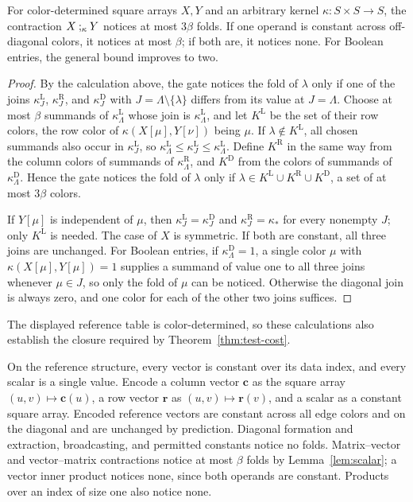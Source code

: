 \begin{lemma}\label{lem:scalar}
For color-determined square arrays $X,Y$ and an arbitrary kernel
$\kappa:S\times S\to S$, the contraction $X\mathbin{;_{\kappa}} Y$ notices
at most $3\beta$ folds. If one operand is constant across off-diagonal
colors, it notices at most $\beta$; if both are, it notices none.
For Boolean entries, the general bound improves to two.
\end{lemma}
\begin{proof}
By the calculation above, the gate notices the fold of $\lambda$
only if one of the joins $\kappa_J^{\mathrm L}$,
$\kappa_J^{\mathrm R}$, and $\kappa_J^{\mathrm D}$ with
$J=\Lambda\setminus\{\lambda\}$ differs from its value at
$J=\Lambda$. Choose at most $\beta$ summands of
$\kappa_\Lambda^{\mathrm L}$ whose join is
$\kappa_\Lambda^{\mathrm L}$, and let $K^{\mathrm L}$ be the
set of their row colors, the row color of
$\kappa(X[\mu],Y[\nu])$ being $\mu$. If
$\lambda\notin K^{\mathrm L}$, all chosen summands also occur in
$\kappa_J^{\mathrm L}$, so
$\kappa_\Lambda^{\mathrm L}\le
\kappa_J^{\mathrm L}\le\kappa_\Lambda^{\mathrm L}$.
Define $K^{\mathrm R}$ in the same way from the column colors of
summands of $\kappa_\Lambda^{\mathrm R}$, and $K^{\mathrm D}$
from the colors of summands of $\kappa_\Lambda^{\mathrm D}$.
Hence the gate notices the fold of $\lambda$ only if
$\lambda\in K^{\mathrm L}\cup K^{\mathrm R}\cup K^{\mathrm D}$,
a set of at most $3\beta$ colors.

If $Y[\mu]$ is independent of $\mu$, then
$\kappa_J^{\mathrm L}=\kappa_J^{\mathrm D}$ and
$\kappa_J^{\mathrm R}=\kappa_*$ for every nonempty $J$;
only $K^{\mathrm L}$ is needed. The case of $X$ is symmetric.
If both are constant, all three joins are unchanged.
For Boolean entries, if $\kappa_\Lambda^{\mathrm D}=1$, a single
color $\mu$ with $\kappa(X[\mu],Y[\mu])=1$ supplies a summand
of value one to all three joins whenever $\mu\in J$, so only the
fold of $\mu$ can be noticed. Otherwise the diagonal join is
always zero, and one color for each of the other two joins suffices.
\end{proof}
The displayed reference table is color-determined, so these
calculations also establish the closure required by
Theorem~\ref{thm:test-cost}.

On the reference structure, every vector is constant over its data
index, and every scalar is a single value. Encode a column vector
$\mathbf c$ as the square array $(u,v)\mapsto\mathbf c(u)$,
a row vector $\mathbf r$ as $(u,v)\mapsto\mathbf r(v)$, and a
scalar as a constant square array. Encoded reference vectors are
constant across all edge colors and on the diagonal and are
unchanged by prediction. Diagonal formation and extraction,
broadcasting, and permitted constants notice no folds.
Matrix--vector and vector--matrix contractions notice at most
$\beta$ folds by Lemma~\ref{lem:scalar}; a vector inner product
notices none, since both operands are constant.
Products over an index of size one also notice none.

